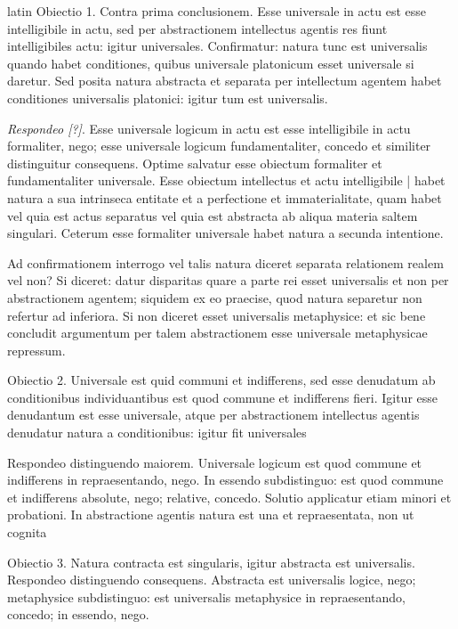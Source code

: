 \begin{otherlanguage*}{latin}
\pstart
  Obiectio 1. Contra prima conclusionem. Esse universale in actu est esse intelligibile in actu, sed per abstractionem intellectus agentis res fiunt intelligibiles actu: igitur universales. Confirmatur: natura tunc est universalis quando habet conditiones, quibus universale platonicum esset universale si daretur. Sed posita natura abstracta et separata per intellectum agentem habet conditiones universalis platonici: igitur tum est universalis. 
\pend

\pstart
  \emph{Respondeo [?]}. Esse universale logicum in actu est esse intelligibile in actu formaliter, nego; esse universale logicum fundamentaliter, concedo et similiter distinguitur consequens. Optime salvatur esse obiectum formaliter et fundamentaliter universale. Esse obiectum intellectus et actu intelligibile \textnormal{|}   habet natura a sua intrinseca entitate et a perfectione et immaterialitate, quam habet vel quia est actus separatus vel quia est abstracta ab aliqua materia saltem singulari. Ceterum esse formaliter universale habet natura a secunda intentione. 
\pend

\pstart
  Ad confirmationem interrogo vel talis natura diceret separata relationem realem vel non? Si diceret: datur disparitas quare a parte rei esset universalis et non per abstractionem agentem; siquidem ex eo praecise, quod natura separetur non refertur ad inferiora. Si non diceret esset universalis metaphysice: et sic bene concludit argumentum per talem abstractionem esse universale metaphysicae repressum. 
\pend

\pstart
  Obiectio 2. Universale est quid communi et indifferens, sed esse denudatum ab conditionibus individuantibus est quod commune et indifferens fieri. Igitur esse denudantum est esse universale, atque per abstractionem intellectus agentis denudatur natura a conditionibus: igitur fit universales 
\pend

\pstart
  Respondeo distinguendo maiorem. Universale logicum est quod commune et indifferens in repraesentando, nego. In essendo subdistinguo: est quod commune et indifferens absolute, nego; relative, concedo. Solutio applicatur etiam minori et probationi. In abstractione agentis natura est una et repraesentata, non ut cognita 
\pend

\pstart
  Obiectio 3. Natura contracta est singularis, igitur abstracta est universalis. Respondeo distinguendo consequens. Abstracta est universalis logice, nego; metaphysice subdistinguo: est universalis metaphysice in repraesentando, concedo; in essendo, nego. 
\pend


\end{otherlanguage*}
